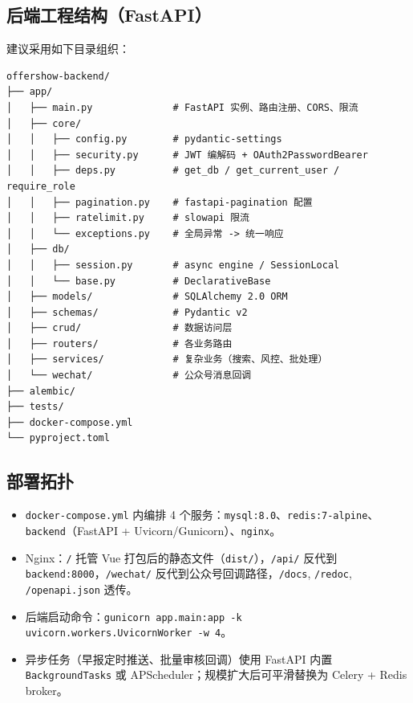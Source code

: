 \documentclass[11pt,a4paper]{ctexart}
\begin{document}
\subsection{后端工程结构（FastAPI）}
建议采用如下目录组织：
\begin{lstlisting}[language={}]
offershow-backend/
├── app/
│   ├── main.py              # FastAPI 实例、路由注册、CORS、限流
│   ├── core/
│   │   ├── config.py        # pydantic-settings
│   │   ├── security.py      # JWT 编解码 + OAuth2PasswordBearer
│   │   ├── deps.py          # get_db / get_current_user / require_role
│   │   ├── pagination.py    # fastapi-pagination 配置
│   │   ├── ratelimit.py     # slowapi 限流
│   │   └── exceptions.py    # 全局异常 -> 统一响应
│   ├── db/
│   │   ├── session.py       # async engine / SessionLocal
│   │   └── base.py          # DeclarativeBase
│   ├── models/              # SQLAlchemy 2.0 ORM
│   ├── schemas/             # Pydantic v2
│   ├── crud/                # 数据访问层
│   ├── routers/             # 各业务路由
│   ├── services/            # 复杂业务（搜索、风控、批处理）
│   └── wechat/              # 公众号消息回调
├── alembic/
├── tests/
├── docker-compose.yml
└── pyproject.toml
\end{lstlisting}

\subsection{部署拓扑}
\begin{itemize}[leftmargin=2em]
    \item \texttt{docker-compose.yml} 内编排 4 个服务：\texttt{mysql:8.0}、\texttt{redis:7-alpine}、\texttt{backend}（FastAPI + Uvicorn/Gunicorn）、\texttt{nginx}。
    \item Nginx：\texttt{/} 托管 Vue 打包后的静态文件（\texttt{dist/}），\texttt{/api/} 反代到 \texttt{backend:8000}，\texttt{/wechat/} 反代到公众号回调路径，\texttt{/docs}, \texttt{/redoc}, \texttt{/openapi.json} 透传。
    \item 后端启动命令：\texttt{gunicorn app.main:app -k uvicorn.workers.UvicornWorker -w 4}。
    \item 异步任务（早报定时推送、批量审核回调）使用 FastAPI 内置 \texttt{BackgroundTasks} 或 APScheduler；规模扩大后可平滑替换为 Celery + Redis broker。
\end{itemize}
\end{document}
